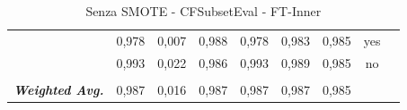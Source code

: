 \begin{table}[htbp]
{\begin{tabular}{rrrrrrrrr}
			\multicolumn{1}{c}{} & \multicolumn{1}{c}{0,978} & \multicolumn{1}{c}{0,007} & \multicolumn{1}{c}{0,988} & \multicolumn{1}{c}{0,978} & \multicolumn{1}{c}{0,983} & \multicolumn{1}{c}{0,985} & \multicolumn{1}{c}{yes} &  \\
			\multicolumn{1}{c}{} & \multicolumn{1}{c}{0,993} & \multicolumn{1}{c}{0,022} & \multicolumn{1}{c}{0,986} & \multicolumn{1}{c}{0,993} & \multicolumn{1}{c}{0,989} & \multicolumn{1}{c}{0,985} & \multicolumn{1}{c}{no} &  \\
			\multicolumn{1}{c}{} & \multicolumn{1}{c}{} & \multicolumn{1}{c}{} & \multicolumn{1}{c}{} & \multicolumn{1}{c}{} & \multicolumn{1}{c}{} & \multicolumn{1}{c}{} & \multicolumn{1}{c}{} &  \\
			\multicolumn{1}{c}{\textit{\textbf{Weighted Avg.}}} & \multicolumn{1}{c}{0,987} & \multicolumn{1}{c}{0,016} & \multicolumn{1}{c}{0,987} & \multicolumn{1}{c}{0,987} & \multicolumn{1}{c}{0,987} & \multicolumn{1}{c}{0,985} & \multicolumn{1}{c}{} &  \\
		\end{tabular}%
	}
	\label{tab:FTInnerFiltered}%
	\caption{ Senza SMOTE - CFSubsetEval - FT-Inner}
\end{table}%

